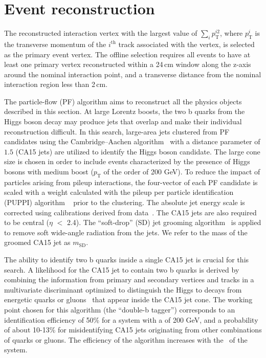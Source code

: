 


\section{Event reconstruction}

The reconstructed interaction vertex with the largest value of $\sum_{i} p_\mathrm{T}^{i2}$, where $p_\mathrm{T}^{i}$ is the transverse momentum of the $i^\mathrm{th}$ track 
associated with the vertex, is selected as the primary event vertex. The offline selection requires all events to have at least one primary vertex reconstructed within a 24\,cm window along the z-axis around the nominal interaction point, and a transverse distance from the nominal interaction region less than 2\,cm.

The particle-flow (PF) \cite{Sirunyan:2017ulk} algorithm aims to reconstruct all the physics objects described in this section. At large Lorentz boosts, the two b quarks from the Higgs boson decay may produce jets that overlap and make their individual reconstruction difficult. In this search, large-area jets clustered from PF candidates using the Cambridge--Aachen algorithm~\cite{cajets} with a distance parameter of $1.5$ (CA15 jets) are utilized to identify the Higgs boson candidate.  The large cone size is chosen in order to include events characterized by the presence of Higgs bosons with medium boost ($p_\mathrm{T}$ of the order of 200 GeV).
To reduce the impact of particles arising from pileup interactions,  the four-vector of each PF candidate is scaled with a weight calculated with the pileup per particle identification (PUPPI) algorithm ~\cite{puppi} prior to the clustering.
The absolute jet energy scale is corrected using calibrations derived from data~\cite{jec}. The CA15 jets are also required to be central ($\eta$ $<$ 2.4).
The ``soft-drop'' (SD) jet grooming algorithm~\cite{msd} is applied to remove soft wide-angle radiation from the jets. We refer to the mass of the groomed CA15 jet as $m_\text{SD}$. 

The ability to identify two b quarks inside a single CA15 jet is
crucial for this search. A likelihood for the CA15 jet to contain two
b quarks is derived by combining the information from primary and secondary vertices and tracks in a multivariate discriminant optimized to distinguish the Higgs to \bb decays from energetic quarks or gluons~\cite{Sirunyan:2017ezt} that appear inside the CA15 jet cone.
The working point chosen for this algorithm (the ``double-b tagger'')
corresponds to an identification efficiency of 50\% for a \bb system
with a \pt of 200 GeV, and a probability of about 10-13\% for
misidentifying CA15 jets originating from other combinations of quarks
or gluons. The efficiency of the algorithm increases with the \pt~of the \bb system.

